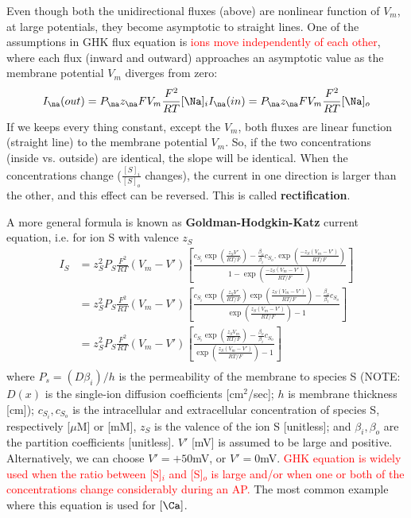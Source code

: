 Even though both the unidirectional fluxes (above) are nonlinear function of
$V_m$, at large potentials, they become asymptotic to straight lines.
One of the assumptions in GHK flux equation is \textcolor{red}{ions move
independently of each other}, where each flux (inward and outward) approaches an
asymptotic value as the membrane potential $V_m$ diverges from zero:
\begin{equation}
I_\na(out) = P_\na z_\na F V_m \frac{F^2}{RT}[\Na]_i \\
I_\na(in) = P_\na z_\na F V_m \frac{F^2}{RT}[\Na]_o \\
\end{equation}
If we keeps every thing constant, except the $V_m$, both fluxes are linear
function (straight line) to the membrane potential $V_m$. So, if the two
concentrations (inside vs. outside) are identical, the slope will be identical.
When the concentrations change ($\frac{[S]_i}{[S]_o}$ changes), the current in
one direction is larger than the other, and this effect can be reversed. This is
called {\bf rectification}.


A more general formula is known as {\bf Goldman-Hodgkin-Katz} current equation,
i.e. for ion S with valence $z_S$
\begin{equation}
  \label{eq:GHK-current}
  \begin{split}
    I_S &= z_S^2 P_S\frac{F^2}{RT}(V_m-V')
    \left[\frac{c_{S_i}\exp(\frac{z_SV'}{RT/F})-\frac{\beta_o}{\beta_i}c_{S_o}.\exp\left(\frac{-z_S(V_m-V')}{RT/F}\right)}{1-\exp\left(\frac{-z_S(V_m-V')}{RT/F}\right)}
    \right] \\
    &= z_S^2 P_S\frac{F^2}{RT}(V_m-V')
    \left[\frac{c_{S_i}\exp(\frac{z_SV'}{RT/F})\exp\left(\frac{z_S(V_m-V')}{RT/F}\right)-\frac{\beta_o}{\beta_i}c_{S_o}}{\exp\left(\frac{z_S(V_m-V')}{RT/F}
        \right) - 1}
    \right] \\
    &= z_S^2 P_S\frac{F^2}{RT}(V_m-V')
    \left[\frac{c_{S_i}\exp\left(\frac{z_SV_m}{RT/F}\right)-\frac{\beta_o}{\beta_i}c_{S_o}}{\exp\left(\frac{z_S(V_m-V')}{RT/F}
        \right) - 1}
    \right] \\
  \end{split}
\end{equation}
where $P_s=(D\beta_i)/h$ is the permeability of the membrane to species S
(NOTE: $D(x)$ is the single-ion diffusion coefficients [cm$^2$/sec];
$h$ is membrane thickness [cm]); $c_{S_i},c_{S_o}$ is the intracellular and extracellular
concentration of species S, respectively [$\mu$M] or [mM], $z_S$ is the valence of the ion S
[unitless]; and $\beta_i, \beta_o$ are the partition coefficients
[unitless]. $V'$ [mV] is assumed to be large and positive. Alternatively, we can
choose $V'=+50$mV, or $V'=0$mV.
\textcolor{red}{GHK equation is widely used when the ratio between [S]$_i$ and
[S]$_o$ is large and/or when one or both of the concentrations change
considerably during an AP.} The most common example where this equation is used
for $[\Ca]$.


